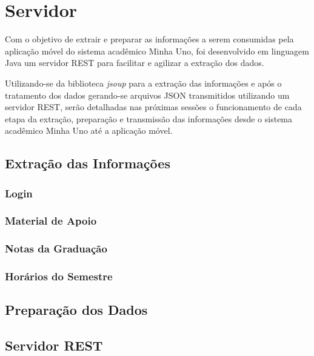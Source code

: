 \chapter{Servidor}

Com o objetivo de extrair e preparar as informações a serem consumidas pela aplicação móvel do sistema acadêmico Minha Uno, foi desenvolvido em linguagem Java um servidor REST para facilitar e agilizar a extração dos dados. 

Utilizando-se da biblioteca \emph{jsoup} para a extração das informações e após o tratamento dos dados gerando-se arquivos JSON transmitidos utilizando um servidor REST, serão detalhadas nas próximas sessões o funcionamento de cada etapa da extração, preparação e transmissão das informações desde o sistema acadêmico Minha Uno até a aplicação móvel.

\section{Extração das Informações}

\subsection{Login}
\subsection{Material de Apoio}
\subsection{Notas da Graduação}
\subsection{Horários do Semestre}

\section{Preparação dos Dados}

\section{Servidor REST}
